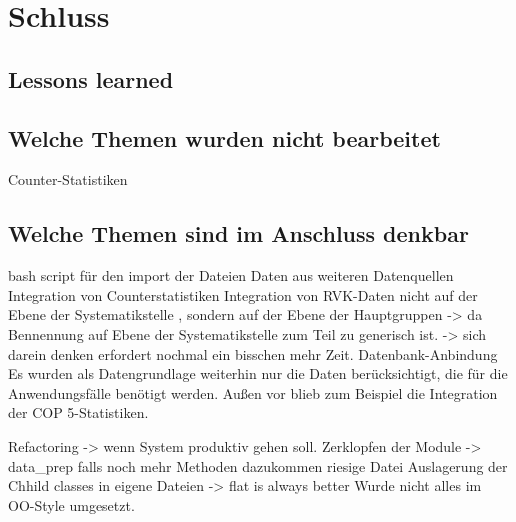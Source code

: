 
\chapter{Schluss}
\label{chap:six}
\section{Lessons learned}
\section{Welche Themen wurden nicht bearbeitet}
Counter-Statistiken

\section{Welche Themen sind im Anschluss denkbar}
bash script für den import der Dateien
Daten aus weiteren Datenquellen
Integration von Counterstatistiken
Integration von RVK-Daten nicht auf der Ebene der Systematikstelle , sondern auf der Ebene
der Hauptgruppen -> da Bennennung auf Ebene der Systematikstelle zum Teil zu generisch ist. 
-> sich darein denken erfordert nochmal ein bisschen mehr Zeit.
Datenbank-Anbindung
Es wurden als Datengrundlage weiterhin nur die Daten berücksichtigt, 
    die für die Anwendungsfälle benötigt werden. Außen vor blieb zum Beispiel die Integration der \acrshort{COP 5}-Statistiken.

Refactoring -> wenn System produktiv gehen soll.
Zerklopfen der Module -> data\_prep falls noch mehr Methoden dazukommen  riesige Datei Auslagerung der Chhild classes in eigene Dateien
-> flat is always better
Wurde nicht alles im OO-Style umgesetzt.